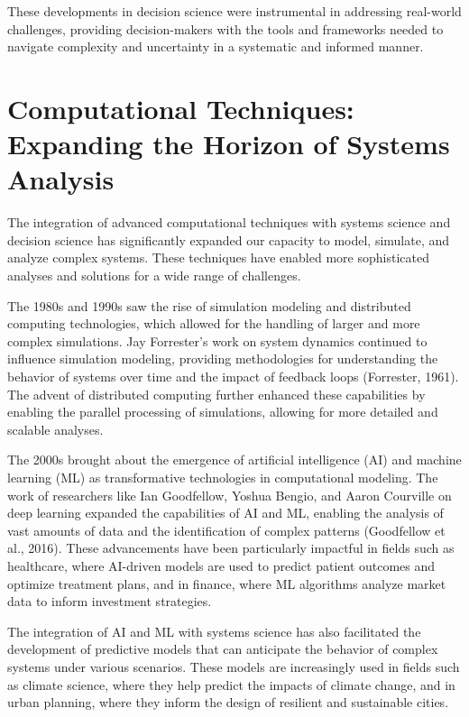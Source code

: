 \documentclass[twocolumn]{article}
\begin{document}
\textcolor{secondary}{These developments in decision science were instrumental in addressing real-world challenges, providing decision-makers with the tools and frameworks needed to navigate complexity and uncertainty in a systematic and informed manner.}


\section{Computational Techniques: Expanding the Horizon of Systems Analysis}

\textcolor{primary}{The integration of advanced computational techniques with systems science and decision science has significantly expanded our capacity to model, simulate, and analyze complex systems. These techniques have enabled more sophisticated analyses and solutions for a wide range of challenges.}


\textcolor{secondary}{The 1980s and 1990s saw the rise of simulation modeling and distributed computing technologies, which allowed for the handling of larger and more complex simulations. Jay Forrester’s work on system dynamics continued to influence simulation modeling, providing methodologies for understanding the behavior of systems over time and the impact of feedback loops (Forrester, 1961). The advent of distributed computing further enhanced these capabilities by enabling the parallel processing of simulations, allowing for more detailed and scalable analyses.}

\textcolor{primary}{The 2000s brought about the emergence of artificial intelligence (AI) and machine learning (ML) as transformative technologies in computational modeling. The work of researchers like Ian Goodfellow, Yoshua Bengio, and Aaron Courville on deep learning expanded the capabilities of AI and ML, enabling the analysis of vast amounts of data and the identification of complex patterns (Goodfellow et al., 2016). These advancements have been particularly impactful in fields such as healthcare, where AI-driven models are used to predict patient outcomes and optimize treatment plans, and in finance, where ML algorithms analyze market data to inform investment strategies.}


\textcolor{secondary}{The integration of AI and ML with systems science has also facilitated the development of predictive models that can anticipate the behavior of complex systems under various scenarios. These models are increasingly used in fields such as climate science, where they help predict the impacts of climate change, and in urban planning, where they inform the design of resilient and sustainable cities.}
\end{document}
